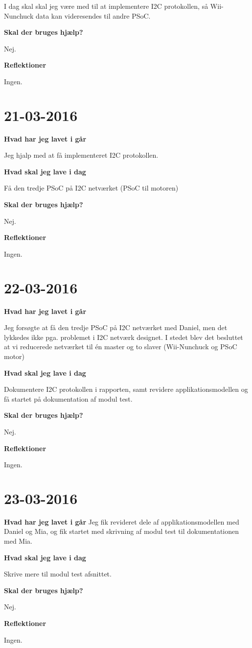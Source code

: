 \documentclass{article}
\begin{document}
	I dag skal skal jeg være med til at implementere I2C protokollen, så Wii-Nunchuck data kan videresendes til andre PSoC.
	
	\textbf{Skal der bruges hjælp?}
	
	Nej.
	
	\textbf{Reflektioner}
	
	Ingen.
	
	\section{21-03-2016}
	
	\textbf{Hvad har jeg lavet i går}
	
	Jeg hjalp med at få implementeret I2C protokollen.
	
	\textbf{Hvad skal jeg lave i dag}
	
	Få den tredje PSoC på I2C netværket (PSoC til motoren)
	
	\textbf{Skal der bruges hjælp?}
	
	Nej.
	
	\textbf{Reflektioner}
	
	Ingen.
	
	\section{22-03-2016}
	
	\textbf{Hvad har jeg lavet i går}
	
	Jeg forsøgte at få den tredje PSoC på I2C netværket med Daniel, men det lykkedes ikke pga. problemet i I2C netværk designet. I stedet blev det besluttet at vi reducerede netværket til én master og to slaver (Wii-Nunchuck og PSoC motor) 
	
	\textbf{Hvad skal jeg lave i dag}
	
	Dokumentere I2C protokollen i rapporten, samt revidere applikationsmodellen og få startet på dokumentation af modul test.
	
	\textbf{Skal der bruges hjælp?}
	
	Nej.
	
	\textbf{Reflektioner}
	
	Ingen.	

	\section{23-03-2016}
	
	\textbf{Hvad har jeg lavet i går}
	Jeg fik revideret dele af applikationsmodellen med Daniel og Mia, og fik startet med skrivning af modul test til dokumentationen med Mia. 
	
	\textbf{Hvad skal jeg lave i dag}
	
	Skrive mere til modul test afsnittet.
	
	\textbf{Skal der bruges hjælp?}
	
	Nej.
	
	\textbf{Reflektioner}
	
	Ingen.	
\end{document}
